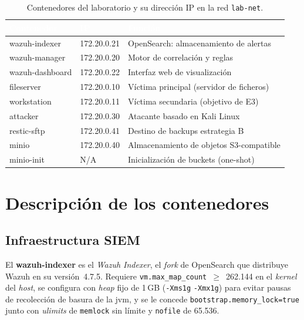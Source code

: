 \documentclass[../main.tex]{subfiles}
\begin{document}
\begin{table}[ht]
  \centering
  \begin{tabularx}{\textwidth}{C{2.5cm} C{3cm} X}
    \toprule
    \textcolor{white}{\textbf{Contenedor}} &
    \textcolor{white}{\textbf{IP}} &
    \textcolor{white}{\textbf{Función}} \\
    \midrule
    wazuh-indexer   & 172.20.0.21 & OpenSearch: almacenamiento de alertas \\
    wazuh-manager   & 172.20.0.20 & Motor de correlación y reglas \\
    wazuh-dashboard & 172.20.0.22 & Interfaz web de visualización \\
    fileserver      & 172.20.0.10 & Víctima principal (servidor de ficheros) \\
    workstation     & 172.20.0.11 & Víctima secundaria (objetivo de E3) \\
    attacker        & 172.20.0.30 & Atacante basado en Kali Linux \\
    restic-sftp     & 172.20.0.41 & Destino de backups estrategia B \\
    minio           & 172.20.0.40 & Almacenamiento de objetos S3-compatible \\
    minio-init      & N/A & Inicialización de buckets (one-shot) \\
    \bottomrule
  \end{tabularx}
  \caption{Contenedores del laboratorio y su dirección IP en la red \texttt{lab-net}.}
  \label{tab:contenedores}
\end{table}

\section{Descripción de los contenedores}

\subsection{Infraestructura SIEM}

El \textbf{wazuh-indexer} es el \emph{Wazuh Indexer}, el \emph{fork} de OpenSearch
que distribuye Wazuh en su versión~4.7.5. Requiere
\texttt{vm.max\_map\_count}~$\geq$~262.144 en el \emph{kernel} del \emph{host},
se configura con \emph{heap} fijo de 1\,GB (\texttt{-Xms1g} \texttt{-Xmx1g}) para
evitar pausas de recolección de basura de la \gls{jvm}, y se le concede
\texttt{bootstrap.memory\_lock=true} junto con \emph{ulimits} de \texttt{memlock}
sin límite y \texttt{nofile} de 65.536.
\end{document}
